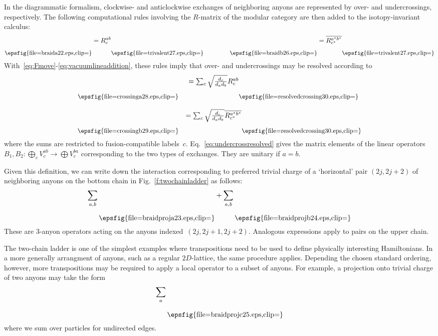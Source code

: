 \documentclass[floats,prb,twocolumn]{revtex4}
\newcommand*{\braida}{\raisebox{-21.123pt}{\epsfig{file=braida22.eps,clip=}}}
\newcommand*{\braidproja}{\raisebox{-32.463pt}{\epsfig{file=braidproja23.eps,clip=}}}
\newcommand*{\braidprojb}{\raisebox{-32.463pt}{\epsfig{file=braidprojb24.eps,clip=}}}
\newcommand*{\braidprojc}{\raisebox{-32.463pt}{\epsfig{file=braidprojc25.eps,clip=}}}
\newcommand*{\braidb}{\raisebox{-21.123pt}{\epsfig{file=braidb26.eps,clip=}}}
\newcommand*{\trivalent}{\raisebox{-21.123pt}{\epsfig{file=trivalent27.eps,clip=}}}
\newcommand*{\crossinga}{\raisebox{-24.003pt}{\epsfig{file=crossinga28.eps,clip=}}}
\newcommand*{\crossingb}{\raisebox{-24.003pt}{\epsfig{file=crossingb29.eps,clip=}}}
\newcommand*{\resolvedcrossing}{\raisebox{-24.003pt}{\epsfig{file=resolvedcrossing30.eps,clip=}}}
\begin{document}
 In the diagrammatic formalism, clockwise- and anticlockwise exchanges of neighboring anyons are represented by over- and undercrossings, respectively. The following computational rules involving the $R$-matrix of the modular category are then added to the isotopy-invariant calculus:
\begin{align*}
\scalebox{0.9}{\braida}=R^{ab}_c\scalebox{0.9}{\trivalent}\qquad\qquad\scalebox{0.9}{\braidb}=\overline{R^{a^*b^*}_{c^*}}\scalebox{0.9}{\trivalent}
\end{align*}
With~\eqref{eq:Fmove}-\eqref{eq:vacuumlineaddition}, these rules imply that over- and undercrossings may be resolved according to
\begin{align}
\begin{matrix}
\scalebox{0.9}{\crossinga} &=\sum_{c}\sqrt{\frac{d_c}{d_ad_b}}R^{ab}_c\scalebox{0.9}{\resolvedcrossing}\\
\vspace{0.25ex}\\
\scalebox{0.9}{\crossingb}&=\sum_{c}\sqrt{\frac{d_c}{d_ad_b}}\overline{R^{a^*b^*}_{c^*}}\scalebox{0.9}{\resolvedcrossing}
\end{matrix} \label{eq:undercrossresolved}
\end{align}
where the sums are restricted to fusion-compatible labels~$c$.  Eq.~\eqref{eq:undercrossresolved} gives the matrix elements of the linear operators $B_1,B_2:\bigoplus_c V^{ab}_c\rightarrow\bigoplus V^{ba}_c$ corresponding to the two types of exchanges. They are unitary if $a=b$. 


Given this definition, we can write down the interaction corresponding to preferred trivial charge of a `horizontal' pair $(2j,2j+2)$ of neighboring anyons on the bottom chain in Fig.~\ref{f:twochainladder} as follows:
\begin{align*}
\sum_{a,b}\braidproja+\sum_{a,b}\braidprojb
\end{align*}
These are $3$-anyon operators acting on the anyons indexed~$(2j,2j+1,2j+2)$. Analogous expressions apply to pairs on the upper chain. 

The two-chain ladder is one of the simplest examples where transpositions need to be used to define physically interesting Hamiltonians. In a more generally arrangment of anyons, such as a regular $2D$-lattice, the same procedure applies. Depending the chosen standard ordering, however, more transpositions may be required to apply a local operator to a subset of anyons. For example, a projection onto trivial charge of two anyons may take the form
\begin{align}
\sum_a\braidprojc\label{eq:multianyonbraid}
\end{align}
where we sum over particles for undirected edges.
\end{document}
